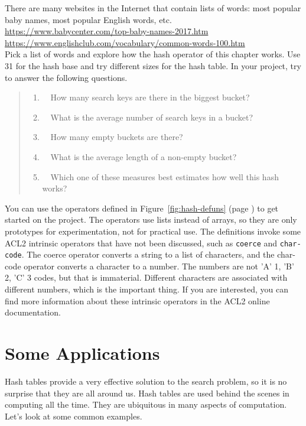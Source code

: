 \begin{ExerciseList}
\Exercise There are many websites in the Internet that contain lists of words:
most popular baby names, most popular English words, etc.\\
\hspace*{1cm}\url{https://www.babycenter.com/top-baby-names-2017.htm} \\
\hspace*{1cm}\url{https://www.englishclub.com/vocabulary/common-words-100.htm}\\
Pick a list of words and explore how the hash operator of this chapter works.
Use 31 for the hash base and try different sizes for the hash table.
In your project, try to answer the following questions.
\begin{quote}
\begin{enumerate}
\item ~~How many search keys are there in the biggest bucket?
\item ~~What is the average number of search keys in a bucket?
\item ~~How many empty buckets are there?
\item ~~What is the average length of a non-empty bucket?
\item ~~Which one of these measures best estimates how well this hash works?
\end{enumerate}
\end{quote}
You can use the operators defined in
Figure~\ref{fig:hash-defuns} (page \pageref{fig:hash-defuns})
to get started on the project.
The operators use lists instead of arrays, so they are only  prototypes
for experimentation, not for practical use.
The definitions invoke some ACL2 intrinsic operators
that have not been discussed, such as
\texttt{coerce} and \texttt{char-code}.
The coerce operator converts a string to a list of characters,
and the char-code operator converts a character to a number.
The numbers are not 'A' 1, 'B' 2, 'C' 3 codes, but that is immaterial.
Different characters are associated with different numbers,
which is the important thing. If you are interested,
you can find more information about these intrinsic
operators in the ACL2 online documentation.
\end{ExerciseList}

\section{Some Applications}

Hash tables provide a very effective solution to the search problem,
so it is no surprise that they are all around us.
Hash tables are used behind the scenes in computing all the time.
They are ubiquitous in many aspects of computation.
Let's look at some common examples.

